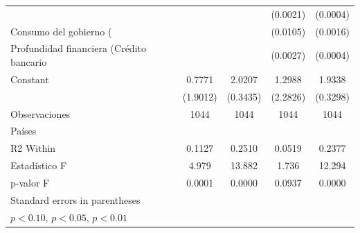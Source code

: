 \begin{table}[htbp]
\begin{tabular}{l*{4}{c}}
                    &                     &                     &    (0.0021)         &    (0.0004)         \\
\addlinespace
Consumo del gobierno (%
                    &                     &                     &    (0.0105)         &    (0.0016)         \\
\addlinespace
Profundidad financiera (Crédito bancario %
                    &                     &                     &    (0.0027)         &    (0.0004)         \\
\addlinespace
Constant            &      0.7771         &      2.0207\sym{***}&      1.2988         &      1.9338\sym{***}\\
                    &    (1.9012)         &    (0.3435)         &    (2.2826)         &    (0.3298)         \\
\midrule
Observaciones       &        1044         &        1044         &        1044         &        1044         \\
Países              &                     &                     &                     &                     \\
R2 Within           &      0.1127         &      0.2510         &      0.0519         &      0.2377         \\
Estadístico F       &       4.979         &      13.882         &       1.736         &      12.294         \\
p-valor F           &      0.0001         &      0.0000         &      0.0937         &      0.0000         \\
\bottomrule
\multicolumn{5}{l}{\footnotesize Standard errors in parentheses}\\
\multicolumn{5}{l}{\footnotesize \sym{*} \(p<0.10\), \sym{**} \(p<0.05\), \sym{***} \(p<0.01\)}\\
\end{tabular}
\end{table}
